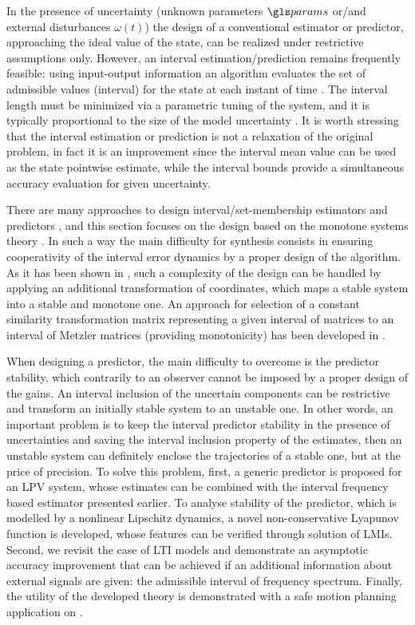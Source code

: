 In the presence of uncertainty (unknown parameters $\params$ or/and external disturbances $\omega(t)$) the design of a conventional estimator or predictor, approaching the ideal value of the state, can be realized under restrictive assumptions only. However, an interval estimation/prediction remains frequently feasible: using input-output information an algorithm evaluates the set of admissible values (interval) for the state at each instant of time \citep{Efimov2016,Raiessi2018}. The interval length must be minimized via a parametric tuning of the system, and it is typically proportional to the size of the model uncertainty \citep{Chebotarev2015}. It is worth stressing that the interval estimation or prediction is not a relaxation of the original problem, in fact it is an improvement since the interval mean value can be used as the state pointwise estimate, while the interval bounds provide a simultaneous accuracy evaluation for given uncertainty.

There are many approaches to design interval/set-membership estimators and predictors \citep{Jaulin02,Kieffer2004,Bernard_Gouze04,Moisan_Bernard_Gouze09}, and this section focuses on the design based on the monotone systems theory \citep{Bernard_Gouze04,Moisan_Bernard_Gouze09,RVZ10,REZ11,Efimov2012}.
In such a way the main difficulty for synthesis consists in ensuring cooperativity of the interval error dynamics by a proper design of the algorithm. As it has been shown in \citep{MazencBernard11,REZ11,Combastel2012}, such a complexity of the design can be handled by applying an additional transformation of coordinates, which maps a stable system into a stable and monotone one. An approach for selection of a constant similarity transformation matrix representing a given interval of matrices to an interval of Metzler matrices (providing monotonicity) has been developed in \citep{Efimov_a2013,Chebotarev2015}. 

When designing a predictor, the main difficulty to overcome is the predictor stability, which contrarily to an observer cannot be imposed by a proper design of the gains. An interval inclusion of the uncertain components can be restrictive and transform an initially stable system to an unstable one. In other words, an important problem is to keep the interval predictor stability in the presence of uncertainties and saving the interval inclusion property of the estimates, then an unstable system can definitely enclose the trajectories of a stable one, but at the price of precision. To solve this problem, first, a generic predictor is proposed for an \gls{LPV} system, whose estimates can be combined with the interval frequency based estimator presented earlier. To analyse stability of the predictor, which is modelled by a nonlinear Lipschitz dynamics, a novel non-conservative Lyapunov function is developed, whose features can be verified through solution of \glspl{LMI}. Second, we revisit the case of \gls{LTI} models and demonstrate an asymptotic accuracy improvement that can be achieved if an additional information about external signals are given: the admissible interval of frequency spectrum. Finally, the utility of the developed theory is demonstrated with a safe motion planning application on \highwayenv.

